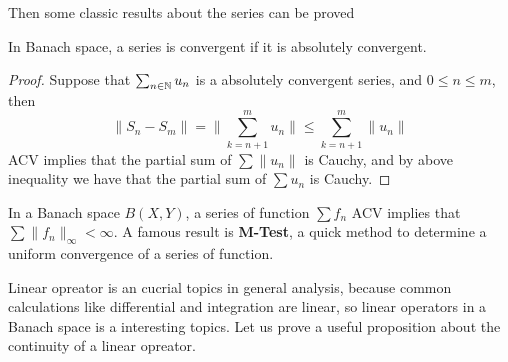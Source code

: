 \documentclass[en,hazy,black,noraml,12pt]{elegantnote}
\begin{document}
Then some classic results about the series can be proved

\begin{proposition}
    In Banach space, a series is convergent if it is absolutely convergent.
    
    \begin{proof}
        Suppose that \(\sum_{n \in \mathbb{N}}u_n\) is a absolutely convergent series, and \(0 \leq n \leq m \), then 
        \[\|S_n-S_m\| = \|\sum_{k=n+1}^{m}u_n\| \leq \sum_{k=n+1}^{m}\|u_n\|\]
        ACV implies that the partial sum of \(\sum\|u_n\|\) is Cauchy, and by above inequality we have that the partial sum of \(\sum u_n\) is Cauchy.
    \end{proof}
\end{proposition}

\begin{remark}
    In a Banach space \(B(X,Y)\), a series of function \(\sum f_n\) ACV implies that \(\sum\|f_n\|_{\infty} < \infty\). A famous result is \textbf{M-Test}, a quick method to determine a uniform convergence of a series of function.
\end{remark}

Linear opreator is an cucrial topics in general analysis, because common calculations like differential and integration are linear, so linear operators in a Banach space is a interesting topics. Let us prove a useful proposition about the continuity of a linear opreator.
\end{document}
